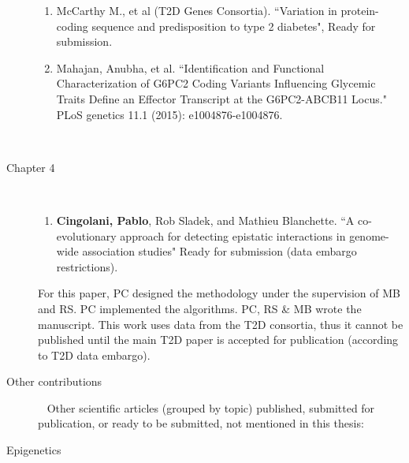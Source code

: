 \begin{description}
		\begin{enumerate}[resume]
		
			\item McCarthy M., et al (T2D Genes Consortia). ``Variation in protein-coding sequence and predisposition to type 2 diabetes", Ready for submission.
			
			\item Mahajan, Anubha, et al. ``Identification and Functional Characterization of G6PC2 Coding Variants Influencing Glycemic Traits Define an Effector Transcript at the G6PC2-ABCB11 Locus." PLoS genetics 11.1 (2015): e1004876-e1004876.
		
		\end{enumerate}
		~ \\
	
	\item[Chapter 4] ~
	
		\begin{enumerate}[resume]
		\item \textbf{Cingolani, Pablo}, Rob Sladek, and Mathieu Blanchette. ``A co-evolutionary approach for detecting epistatic interactions in genome-wide association studies" Ready for submission (data embargo restrictions).
		\end{enumerate}
	
		For this paper, PC designed the methodology under the supervision of MB and RS. PC implemented the algorithms. PC, RS \& MB wrote the manuscript. This work uses data from the T2D consortia, thus it cannot be published until the main T2D paper is accepted for publication (according to T2D data embargo).
		\\
	
	\item[Other contributions] ~	\linebreak
		Other scientific articles (grouped by topic) published, submitted for publication, or ready to be submitted, not mentioned in this thesis:
		\\

	\item[Epigenetics] ~


\end{description}
